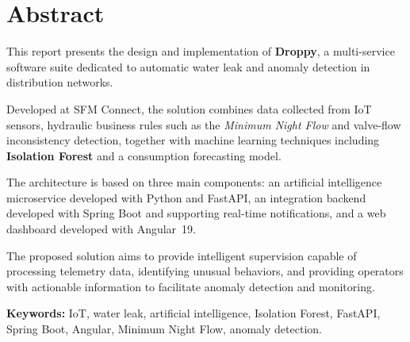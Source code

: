 \documentclass[12pt,a4paper,twoside]{report}
\begin{document}
\chapter*{Abstract}


This report presents the design and implementation of
\textbf{Droppy}, a multi-service software suite dedicated to automatic
water leak and anomaly detection in distribution networks.

Developed at SFM Connect, the solution combines data collected from
IoT sensors, hydraulic business rules such as the
\textit{Minimum Night Flow} and valve-flow inconsistency detection,
together with machine learning techniques including
\textbf{Isolation Forest} and a consumption forecasting model.

The architecture is based on three main components: an artificial
intelligence microservice developed with Python and FastAPI, an
integration backend developed with Spring Boot and supporting
real-time notifications, and a web dashboard developed with Angular~19.

The proposed solution aims to provide intelligent supervision capable
of processing telemetry data, identifying unusual behaviors, and
providing operators with actionable information to facilitate anomaly
detection and monitoring.

\textbf{\textcolor{DroppyBlue}{Keywords:}}
IoT, water leak, artificial intelligence, Isolation Forest, FastAPI,
Spring Boot, Angular, Minimum Night Flow, anomaly detection.

\clearpage


\tableofcontents

\clearpage


\listoffigures


\clearpage

\end{document}
